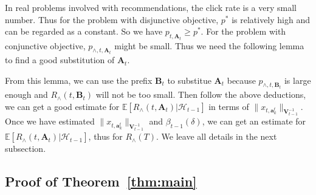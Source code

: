 \documentclass{article}
\newcommand{\EE}{\mathbb{E}}
\newcommand{\bA}{\mathbf{A}}
\newcommand{\ba}{\mathbf{a}}
\newcommand{\bB}{\mathbf{B}}
\newcommand{\bV}{\mathbf{V}}
\newcommand{\cH}{\mathcal{H}}
\newcommand{\abs}[1]{\left| #1 \right|}
\newcommand{\norm}[1]{\| #1 \|}
\newtheorem{lemma}[theorem]{Lemma}%
\begin{document}
{In real problems involved with recommendations, the click rate is a very small number. Thus for the problem with disjunctive objective, $p^*$ is relatively high and can be regarded as a constant. So we have $p_{t, \bA_t} \geq p^*$. For the problem with conjunctive objective, $p_{\wedge, t, \bA_t}$ might be small. Thus we need the following lemma to find a good substitution of $\bA_t$.

From this lemma, we can use the prefix $\bB_t$ to substitue $\bA_t$ because $p_{\wedge, t, \bB_t}$ is large enough and $R_{\wedge}(t, \bB_t)$ will not be too small. Then follow the above deductions, we can get a good estimate for $\EE[R_{\wedge}(t, \bA_t)|\cH_{t-1}]$ in terms of $\norm{x_{t,\ba_k^t}}_{\bV_{t-1}^{-1}}$. Once we have estimated $\norm{x_{t,\ba_k^t}}_{\bV_{t-1}^{-1}}$ and $\beta_{t-1}(\delta)$, we can get an estimate for $\EE[R_{\wedge}(t, \bA_t)|\cH_{t-1}]$, thus for $R_{\wedge}(T)$. We leave all details in the next subsection.
}

\subsection{Proof of Theorem~\ref{thm:main}}
\end{document}

